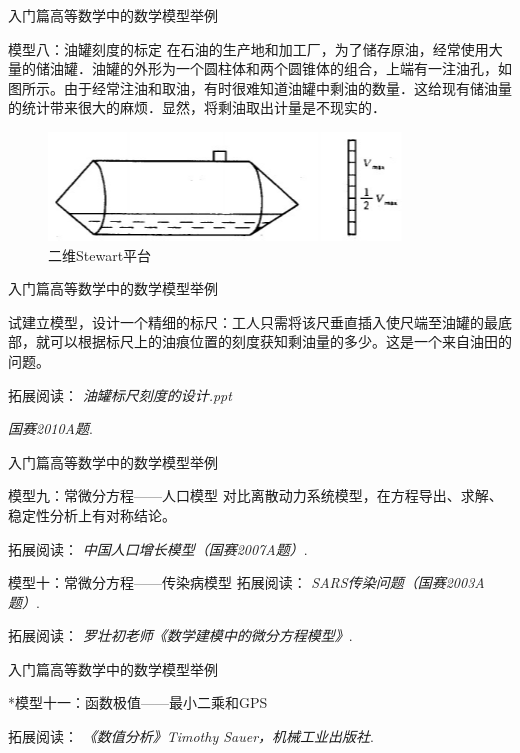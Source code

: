 \documentclass{beamer}
\begin{document}
\begin{frame}{入门篇}{高等数学中的数学模型举例}
\begin{block}{模型八：油罐刻度的标定}
在石油的生产地和加工厂，为了储存原油，经常使用大量的储油罐．油罐的外形为一个圆柱体和两个圆锥体的组合，上端有一注油孔，如图所示。由于经常注油和取油，有时很难知道油罐中剩油的数量．这给现有储油量的统计带来很大的麻烦．显然，将剩油取出计量是不现实的．

\begin{figure}
  \centering
  \includegraphics[width=.6\textwidth]{figure//fig03.png} 
  \caption{二维Stewart平台} 
  \label{fig03} 
\end{figure}

\end{block}
\end{frame}

\begin{frame}{入门篇}{高等数学中的数学模型举例}

试建立模型，设计一个精细的标尺：工人只需将该尺垂直插入使尺端至油罐的最底部，就可以根据标尺上的油痕位置的刻度获知剩油量的多少。这是一个来自油田的问题。

\footnotesize 拓展阅读：
\emph{油罐标尺刻度的设计.ppt}

\emph{国赛2010A题}.

\end{frame}

\begin{frame}{入门篇}{高等数学中的数学模型举例}
\begin{block}{模型九：常微分方程——人口模型}
对比离散动力系统模型，在方程导出、求解、稳定性分析上有对称结论。

\footnotesize 拓展阅读：
\emph{中国人口增长模型（国赛2007A题）}.
\end{block}
\begin{block}{模型十：常微分方程——传染病模型}
\footnotesize 拓展阅读：
\emph{SARS传染问题（国赛2003A题）}.

\footnotesize 拓展阅读：
\emph{罗壮初老师《数学建模中的微分方程模型》}.
\end{block}
\end{frame}

\begin{frame}{入门篇}{高等数学中的数学模型举例}
\begin{block}{*模型十一：函数极值——最小二乘和GPS}

\footnotesize 拓展阅读：
\emph{《数值分析》Timothy Sauer，机械工业出版社}.

\end{block}
\end{frame}
\end{document}

